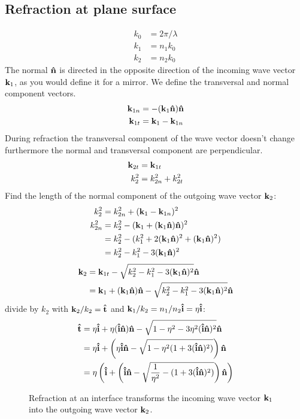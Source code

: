 \documentclass[twocolumn,DIV19]{scrartcl}
\begin{document}
\subsection{Refraction at plane surface}
\begin{align}
  k_0&=2\pi/\lambda\\
  k_1&=n_1 k_0\\
  k_2&=n_2 k_0
\end{align}
The normal $\mathbf{\hat{n}}$ is directed in the opposite direction of the incoming
wave vector $\mathbf{k}_1$, as you would define it for a mirror. We define the
transversal and normal component vectors.
\begin{align}
  \mathbf{k}_{1n}&=-(\mathbf{k}_1\mathbf{\hat{n}})\mathbf{\hat{n}}\\ 
  \mathbf{k}_{1t}&=\mathbf{k}_1 - \mathbf{k}_{1n}
\end{align}
During refraction the transversal component of the wave vector doesn't
change furthermore the normal and transversal component are
perpendicular.
\begin{align}
  \mathbf{k}_{2t}&=\mathbf{k}_{1t}\\
  k_2^2&=k_{2n}^2 + k_{2t}^2
\end{align}
Find the length of the normal component of the outgoing wave vector $\mathbf{k}_2$:
\begin{align}
  k_2^2&=k_{2n}^2 + (\mathbf{k}_1 - \mathbf{k}_{1n})^2\\
  k_{2n}^2&=k_2^2-(\mathbf{k}_1+(\mathbf{k}_1\mathbf{\hat{n}})\mathbf{\hat{n}})^2\\
  &= k_2^2-(k_1^2+2(\mathbf{k}_1\mathbf{\hat{n}})^2+(\mathbf{k}_1\mathbf{\hat{n}})^2)\\
  &= k_2^2-k_1^2-3(\mathbf{k}_1\mathbf{\hat{n}})^2
\end{align}
\begin{align}
  \mathbf{k}_2&=\mathbf{k}_{1t}-\sqrt{k_2^2-k_1^2-3(\mathbf{k}_1\mathbf{\hat{n}})^2}\mathbf{\hat{n}}\\
  &=\mathbf{k}_1+(\mathbf{k}_1\mathbf{\hat{n}})\mathbf{\hat{n}}-\sqrt{k_2^2-k_1^2-3(\mathbf{k}_1\mathbf{\hat{n}})^2}\mathbf{\hat{n}}
\end{align}
divide by $k_2$ with $\mathbf{k}_2/k_2=\mathbf{\hat{t}}$ and $\mathbf{k}_1/k_2=n_1/n_2\mathbf{\hat{i}}=\eta\mathbf{\hat{i}}$:
\begin{align}
  \mathbf{\hat{t}}&=\eta\mathbf{\hat{i}}+\eta(\mathbf{\hat{i}}\mathbf{\hat{n}})\mathbf{\hat{n}}-\sqrt{1-\eta^2-3\eta^2(\mathbf{\hat{i}}\mathbf{\hat{n}})^2}\mathbf{\hat{n}}\\
  &=\eta\mathbf{\hat{i}}+\left(\eta\mathbf{\hat{i}}\mathbf{\hat{n}}-\sqrt{1-\eta^2(1+3(\mathbf{\hat{i}}\mathbf{\hat{n}})^2)}\right)\mathbf{\hat{n}}\\
  &=\eta\left(\mathbf{\hat{i}}+\left(\mathbf{\hat{i}}\mathbf{\hat{n}}-\sqrt{\frac{1}{\eta^2}-(1+3(\mathbf{\hat{i}}\mathbf{\hat{n}})^2)}\right)\mathbf{\hat{n}}\right)
\end{align}
 \begin{figure}
   \centering
   
   \caption{Refraction at an interface transforms the incoming wave
     vector $\mathbf{k}_1$ into the outgoing wave vector $\mathbf{k}_2$.}
 \end{figure}
\end{document}
